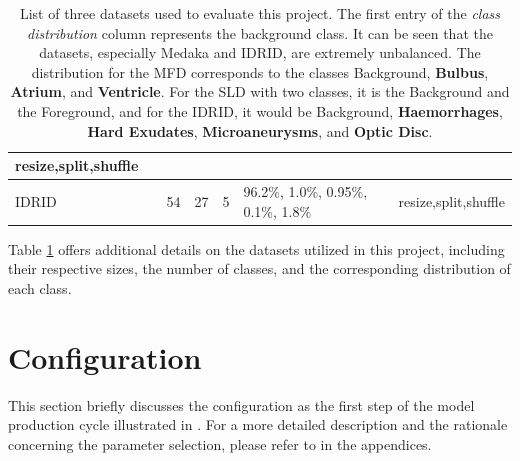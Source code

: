 \begin{table}[H]
{\begin{tabular}{lc|cc|clc}
      \multicolumn{1}{c|}{resize,split,shuffle}                                          \\ \hline
      \multicolumn{1}{|l|}{IDRID}                                                      &
      \cite{h25w9818}                                                                  &
      \multicolumn{1}{c|}{54}                                                          &
      27                                                                               &
      \multicolumn{1}{c|}{5}                                                           &
      \multicolumn{1}{l|}{96.2\%, 1.0\%, 0.95\%, 0.1\%, 1.8\%}                         &
      \multicolumn{1}{c|}{resize,split,shuffle}                                          \\ \hline
    \end{tabular}%
  }
  \caption[Dataset list]{List of three datasets used to evaluate this project. The first entry of the \emph{class distribution} column represents the background class. It can be seen that the datasets, especially Medaka and \ac{IDRID}, are extremely unbalanced. The distribution for the \ac{MFD} corresponds to the classes Background, \textbf{\textcolor{rwuvioletlight}{Bulbus}}, \textbf{\textcolor{rwucyan40}{Atrium}}, and \textbf{\textcolor{rwucyan}{Ventricle}}. For the \ac{SLD} with two classes, it is the Background and the Foreground, and for the \ac{IDRID}, it would be Background, \textbf{\textcolor{rwucyan40}{Haemorrhages}}, \textbf{\textcolor{hardexudates}{Hard Exudates}}, \textbf{\textcolor{microaneurysms}{Microaneurysms}}, and \textbf{\textcolor{rwuviolet}{Optic Disc}}.}\label{tab:datasets}
\end{table}
Table \ref{tab:datasets} offers additional details on the datasets utilized in this project, including their respective sizes, the number of classes, and the corresponding distribution of each class.

\section{Configuration}
\label{sec:configuration}
This section briefly discusses the configuration as the first step of the model production cycle illustrated in . For a more detailed description and the rationale concerning the parameter selection, please refer to  in the appendices.
